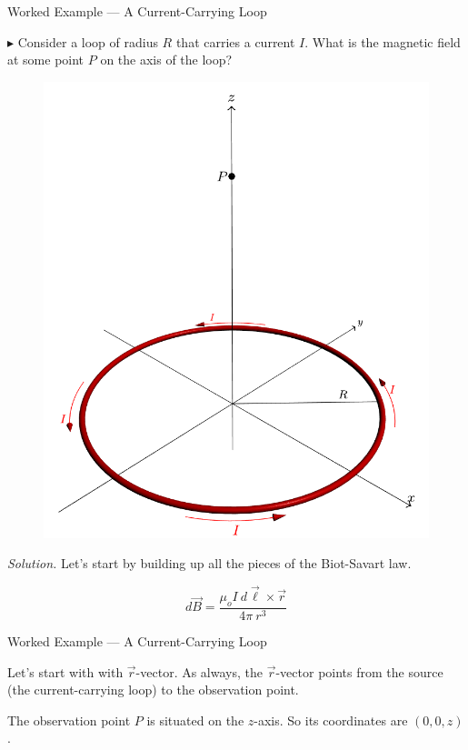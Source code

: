 \documentclass{beamer}
\begin{document}
\begin{frame}{Worked Example --- A Current-Carrying Loop}

$\blacktriangleright$ Consider a loop of radius $R$ that carries a current $I$. What is the magnetic field at some point $P$ on the axis of the loop?

\begin{figure}[H]
\centering
\includegraphics[height=0.46\textheight]{figures/current_carrying_loop.png}
\end{figure}

\textit{Solution.} Let's start by building up all the pieces of the Biot-Savart law.

\begin{equation*}
    d\vec{B} = \frac{\mu_o I\ d\vec{\ell} \times \vec{r}}{4\pi\ r^3}
\end{equation*}

\end{frame}

\begin{frame}{Worked Example --- A Current-Carrying Loop}

Let's start with with $\vec{r}$-vector. As always, the $\vec{r}$-vector points from the source (the current-carrying loop) to the observation point.

\vfill

The observation point $P$ is situated on the $z$-axis. So its coordinates are $(0,0,z)$.

\end{frame}
\end{document}
